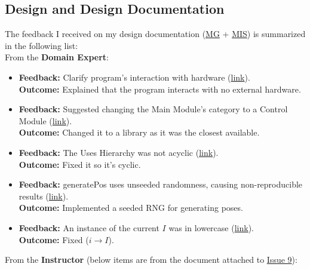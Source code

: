 \documentclass{article}
\begin{document}
\subsection{Design and Design Documentation}
The feedback I received on my design documentation (\href{https://github.com/husseinsd1/optimal-em-arrangement/blob/main/docs/Design/SoftArchitecture/MG.pdf}{MG} + \href{https://github.com/husseinsd1/optimal-em-arrangement/blob/main/docs/Design/SoftDetailedDes/MIS.pdf}{MIS}) is summarized in the following list:\\
From the \textbf{Domain Expert}:
\begin{itemize}
    \item \textbf{Feedback: }Clarify program's interaction with hardware (\href{https://github.com/husseinsd1/optimal-em-arrangement/issues/19}{link}).  \\
          \textbf{Outcome: }Explained that the program interacts with no external hardware.  
    \item \textbf{Feedback: }Suggested changing the Main Module's category to a Control Module  (\href{https://github.com/husseinsd1/optimal-em-arrangement/issues/20}{link}).  \\
          \textbf{Outcome: }Changed it to a library as it was the closest available.  
    \item \textbf{Feedback: }The Uses Hierarchy was not acyclic  (\href{https://github.com/husseinsd1/optimal-em-arrangement/issues/21}{link}).  \\
          \textbf{Outcome: }Fixed it so it's cyclic. 
    \item \textbf{Feedback: }generatePos uses unseeded randomness, causing non-reproducible results  (\href{https://github.com/husseinsd1/optimal-em-arrangement/issues/27}{link}).  \\
          \textbf{Outcome: }Implemented a seeded RNG for generating poses. 
    \item \textbf{Feedback: }An instance of the current $I$ was in lowercase  (\href{https://github.com/husseinsd1/optimal-em-arrangement/issues/28}{link}).  \\
          \textbf{Outcome: }Fixed ($i \rightarrow I$). 
    \end{itemize} 
From the \textbf{Instructor} (below items are from the document attached to \href{https://github.com/husseinsd1/optimal-em-arrangement/issues/9}{Issue 9}):
\end{document}
